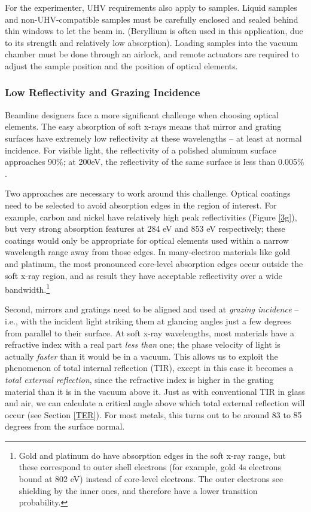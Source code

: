 For the experimenter, UHV requirements also apply to samples.  Liquid samples and non-UHV-compatible samples must be carefully enclosed and sealed behind thin windows to let the beam in. (Beryllium is often used in this application, due to its strength and relatively low absorption).  Loading samples into the vacuum chamber must be done through an airlock, and remote actuators are required to adjust the sample position and the position of optical elements.

\subsubsection{Low Reflectivity and Grazing Incidence}
Beamline designers face a more significant challenge when choosing optical elements.  The easy absorption of soft x-rays means that mirror and grating surfaces have extremely low reflectivity at these wavelengths -- at least at normal incidence.  For visible light, the reflectivity of a polished aluminum surface approaches 90\%; at 200eV, the reflectivity of the same surface is less than 0.005\% \cite{CXR11}.

Two approaches are necessary to work around this challenge.  Optical coatings need to be selected to avoid absorption edges in the region of interest.  For example, carbon and nickel have relatively high peak reflectivities (Figure \ref{3g}), 
but very strong absorption features at 284 eV and 853 eV respectively; these coatings would only be appropriate for optical elements used within a narrow wavelength range away from those edges.  In many-electron materials like gold and platinum, the most pronounced core-level absorption edges occur outside the soft x-ray region, and as result they have acceptable reflectivity over a wide bandwidth.\footnote{Gold and platinum do have absorption edges in the soft x-ray range, but these correspond to outer shell electrons (for example, gold 4s electrons bound at 802 eV) instead of core-level electrons. The outer electrons see shielding by the inner ones, and therefore have a lower transition probability.}

\label{TER-intro}
Second, mirrors and gratings need to be aligned and used at \emph{grazing incidence} -- i.e., with the incident light striking them at glancing angles just a few degrees from parallel to their surface.  At soft x-ray wavelengths, most materials have a refractive index with a real part \emph{less than} one; the phase velocity of light is actually \emph{faster} than it would be in a vacuum.  This allows us to exploit the phenomenon of total internal reflection (TIR), except in this case it becomes a \emph{total external reflection}, since the refractive index is higher in the grating material than it is in the vacuum above it.  Just as with conventional TIR in glass and air, we can calculate a critical angle above which total external reflection will occur (see Section \ref{TER}).
For most metals, this turns out to be around 83 to 85 degrees from the surface normal.

